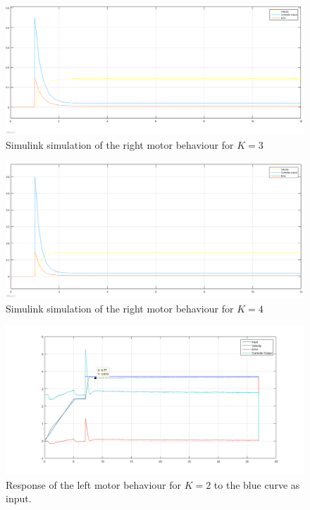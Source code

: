 \begin{figure}[htbp]
\centering
\includegraphics[width = \textwidth]{pics/RM_K3_SIM.png}
\caption{Simulink simulation of the right motor behaviour for $K = 3$}
\label{fig:RM_K3_SIM}
\end{figure}

\begin{figure}[htbp]
\centering
\includegraphics[width = \textwidth]{pics/RM_K4_SIM.png}
\caption{Simulink simulation of the right motor behaviour for $K = 4$}
\label{fig:RM_K4_SIM}
\end{figure}



\begin{figure}[htbp]
\centering
\includegraphics[width = \textwidth]{pics/RM_K2.png}
\caption{Response of the left motor behaviour for $K = 2$ to the blue curve as input.}
\label{fig:RM_K2}
\end{figure}

